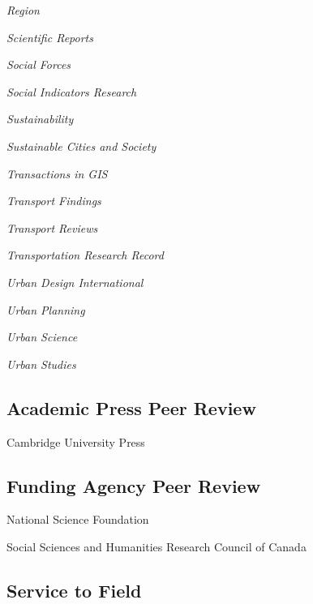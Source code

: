 \documentclass[12pt,letterpaper]{report}
\newcommand{\listitemspace}{0.15em}
\renewenvironment{itemize}
{\begin{list}{}{\setlength{\leftmargin}{0em}
            \setlength{\parskip}{0em}
            \setlength{\itemsep}{\listitemspace}
            \setlength{\parsep}{\listitemspace}}}
    {\end{list}}
\begin{document}
\begin{itemize}
        \item \textit{Region}
        \item \textit{Scientific Reports}
        \item \textit{Social Forces}
        \item \textit{Social Indicators Research}
        \item \textit{Sustainability}
        \item \textit{Sustainable Cities and Society}
        \item \textit{Transactions in GIS}
        \item \textit{Transport Findings}
        \item \textit{Transport Reviews}
        \item \textit{Transportation Research Record}
        \item \textit{Urban Design International}
        \item \textit{Urban Planning}
        \item \textit{Urban Science}
        \item \textit{Urban Studies}

    \end{itemize}

	\subsection*{Academic Press Peer Review}
	
	\begin{itemize}
		
		\item Cambridge University Press
		
	\end{itemize}

    \subsection*{Funding Agency Peer Review}

    \begin{itemize}

        \item National Science Foundation

        \item Social Sciences and Humanities Research Council of Canada

    \end{itemize}

    \subsection*{Service to Field}
\end{document}
